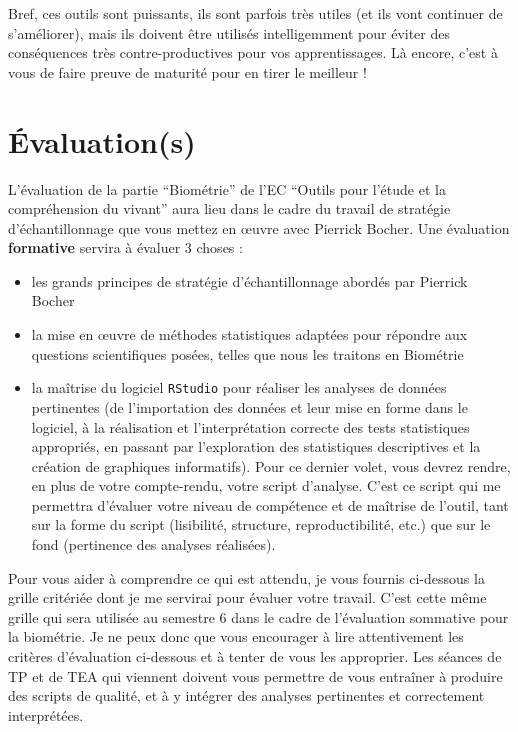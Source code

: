 \documentclass[
  french,
  a4paper,
  DIV=11,
  numbers=noendperiod,
  oneside]{scrreprt}
\providecommand{\tightlist}{%
  \setlength{\itemsep}{0pt}\setlength{\parskip}{0pt}}
\begin{document}
Bref, ces outils sont puissants, ils sont parfois très utiles (et ils
vont continuer de s'améliorer), mais ils doivent être utilisés
intelligemment pour éviter des conséquences très contre-productives pour
vos apprentissages. Là encore, c'est à vous de faire preuve de maturité
pour en tirer le meilleur !

\section*{Évaluation(s)}\label{uxe9valuations}


L'évaluation de la partie ``Biométrie'' de l'EC ``Outils pour l'étude et
la compréhension du vivant'' aura lieu dans le cadre du travail de
stratégie d'échantillonnage que vous mettez en œuvre avec Pierrick
Bocher. Une évaluation \textbf{formative} servira à évaluer 3 choses :

\begin{itemize}
\tightlist
\item
  les grands principes de stratégie d'échantillonnage abordés par
  Pierrick Bocher
\item
  la mise en œuvre de méthodes statistiques adaptées pour répondre aux
  questions scientifiques posées, telles que nous les traitons en
  Biométrie
\item
  la maîtrise du logiciel \texttt{RStudio} pour réaliser les analyses de
  données pertinentes (de l'importation des données et leur mise en
  forme dans le logiciel, à la réalisation et l'interprétation correcte
  des tests statistiques appropriés, en passant par l'exploration des
  statistiques descriptives et la création de graphiques informatifs).
  Pour ce dernier volet, vous devrez rendre, en plus de votre
  compte-rendu, votre script d'analyse. C'est ce script qui me permettra
  d'évaluer votre niveau de compétence et de maîtrise de l'outil, tant
  sur la forme du script (lisibilité, structure, reproductibilité, etc.)
  que sur le fond (pertinence des analyses réalisées).
\end{itemize}

Pour vous aider à comprendre ce qui est attendu, je vous fournis
ci-dessous la grille critériée dont je me servirai pour évaluer votre
travail. C'est cette même grille qui sera utilisée au semestre 6 dans le
cadre de l'évaluation sommative pour la biométrie. Je ne peux donc que
vous encourager à lire attentivement les critères d'évaluation
ci-dessous et à tenter de vous les approprier. Les séances de TP et de
TEA qui viennent doivent vous permettre de vous entraîner à produire des
scripts de qualité, et à y intégrer des analyses pertinentes et
correctement interprétées.
\end{document}
